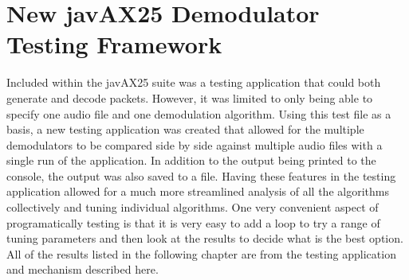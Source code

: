\section{New javAX25 Demodulator Testing Framework}
Included within the javAX25 suite was a testing application that could both generate and decode packets. However, it was limited to only being able to specify one audio file and one demodulation algorithm. Using this test file as a basis, a new testing application was created that allowed for the multiple demodulators to be compared side by side against multiple audio files with a single run of the application. In addition to the output being printed to the console, the output was also saved to a file. Having these features in the testing application allowed for a much more streamlined analysis of all the algorithms collectively and tuning individual algorithms. One very convenient aspect of programatically testing is that it is very easy to add a loop to try a range of tuning parameters and then look at the results to decide what is the best option. All of the results listed in the following chapter are from the testing application and mechanism described here.
